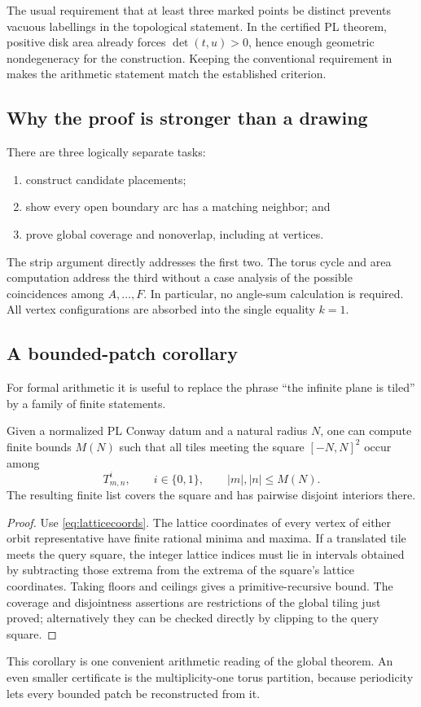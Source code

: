 The usual requirement that at least three marked points be distinct prevents vacuous labellings in the topological statement.  In the certified PL theorem, positive disk area already forces \(\det(t,u)>0\), hence enough geometric nondegeneracy for the construction.  Keeping the conventional requirement in  makes the arithmetic statement match the established criterion.

\subsection{Why the proof is stronger than a drawing}

There are three logically separate tasks:
\begin{enumerate}[label=(\roman*)]
\item construct candidate placements;
\item show every open boundary arc has a matching neighbor; and
\item prove global coverage and nonoverlap, including at vertices.
\end{enumerate}
The strip argument directly addresses the first two.  The torus cycle and area computation address the third without a case analysis of the possible coincidences among \(A,\ldots,F\).  In particular, no angle-sum calculation is required.  All vertex configurations are absorbed into the single equality \(k=1\).

\subsection{A bounded-patch corollary}

For formal arithmetic it is useful to replace the phrase ``the infinite plane is tiled'' by a family of finite statements.

\begin{corollary}
\label{cor:patches}
Given a normalized PL Conway datum and a natural radius \(N\), one can compute finite bounds \(M(N)\) such that all tiles meeting the square \([-N,N]^2\) occur among
\[
 T^i_{m,n},
 \qquad i\in\{0,1\},
 \qquad |m|,|n|\leq M(N).
\]
The resulting finite list covers the square and has pairwise disjoint interiors there.
\end{corollary}
\begin{proof}
Use \cref{eq:latticecoords}.  The lattice coordinates of every vertex of either orbit representative have finite rational minima and maxima.  If a translated tile meets the query square, the integer lattice indices must lie in intervals obtained by subtracting those extrema from the extrema of the square's lattice coordinates.  Taking floors and ceilings gives a primitive-recursive bound.  The coverage and disjointness assertions are restrictions of the global tiling just proved; alternatively they can be checked directly by clipping to the query square.
\end{proof}

This corollary is one convenient arithmetic reading of the global theorem.  An even smaller certificate is the multiplicity-one torus partition, because periodicity lets every bounded patch be reconstructed from it.
